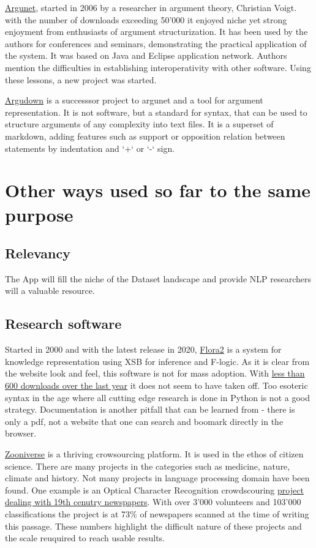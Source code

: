 \documentclass{article}
\begin{document}
\href{http://www.argunet.org/}{Argunet}, started in 2006 by a researcher in argument theory, Christian Voigt. with the number of downloads exceeding 50'000 it enjoyed niche yet strong enjoyment from enthusiasts of argument structurization. It has been used by the authors for conferences and seminars, demonstrating the practical application of the system. It was based on Java and Eclipse application network. Authors mention the difficulties in establishing interoperativity with other software. Using these lessons, a new project was started.

\href{https://argdown.org/}{Argudown} is a successsor project to argunet and a tool for argument representation. It is not software, but a standard for syntax, that can be used to structure arguments of any complexity into text files. It is a superset of markdown, adding features such as support or opposition relation between statements by indentation and `+` or `-` sign.

\section{Other ways used so far to the same purpose}

\subsection{Relevancy}
The App will fill the niche of the Dataset landscape and provide NLP researchers will a valuable resource.

\subsection{Research software}

Started in 2000 and with the latest release in 2020,
\href{https://flora.sourceforge.net/}{Flora2} is a system for knowledge representation using XSB for inference and F-logic.
As it is clear from the website look and feel, this software is not for mass adoption.
With \href{https://sourceforge.net/projects/flora/files/stats/timeline?dates=2021-12-04\%20to\%202022-12-03&period=daily}{less than 600 downloads over the last year} it does not seem to have taken off.
Too esoteric syntax in the age where all cutting edge research is done in Python is not a good strategy. Documentation is another pitfall that can be learned from - there is only a pdf, not a website that one can search and boomark directly in the browser. 

\href{https://www.zooniverse.org/projects}{Zooniverse} is a thriving crowsourcing platform. It is used in the ethos of citizen science. There are many projects in the categories such as medicine, nature, climate and history.  Not many projects in language processing domain have been found. One example is an Optical Character Recognition crowdscouring \href{https://www.zooniverse.org/projects/bldigital/living-with-machines}{project dealing with 19th cenutry newspapers}. With over 3'000 volunteers and 103'000 classifications the project is at 73\% of newspapers scanned at the time of writing this passage.
These numbers highlight the difficult nature of these projects and the scale reuquired to reach usable results.
\end{document}
